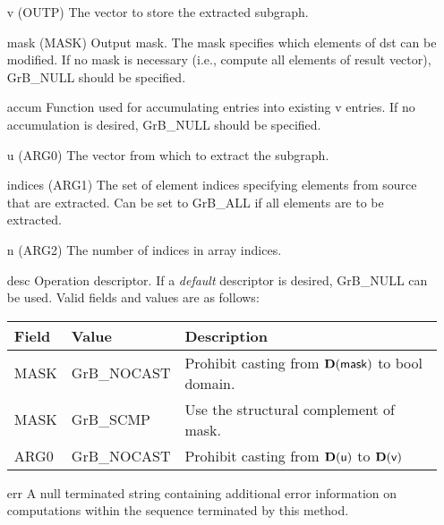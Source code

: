\begin{itemize}[leftmargin=1in]
    \item[{\sf v}]   ({\sf OUTP}) The vector to store the extracted subgraph.

    \item[{\sf mask}] ({\sf MASK}) Output mask. The mask
    specifies which elements of {\sf dst} can be modified.
    If no mask is necessary (i.e., compute all elements of result
    vector), {\sf GrB\_NULL} should be specified.

    \item[{\sf accum}]  Function used for accumulating entries into existing {\sf v} entries. 
			If no accumulation is desired, {\sf GrB\_NULL} should be specified.

    \item[{\sf u}]   ({\sf ARG0}) The vector from which to extract the subgraph.
    \item[{\sf indices}]     ({\sf ARG1}) The set of element indices specifying elements from source that
                              are extracted. Can
                              be set to {\sf GrB\_ALL} if all elements are
                              to be extracted.
    \item[{\sf n}]     ({\sf ARG2}) The number of indices in array {\sf indices}.

    \item[{\sf desc}]   Operation descriptor. If a
    \emph{default} descriptor is desired, {\sf GrB\_NULL} can be
    used.  Valid fields and values are as follows: \\
    \begin{tabular}{lll}
    Field  & Value & Description \\
    \hline
    {\sf MASK} & {\sf GrB\_NOCAST} & Prohibit casting from $\bold{D}({\sf mask})$ to {\sf bool} domain. \\
    {\sf MASK} & {\sf GrB\_SCMP}   & Use the structural complement of {\sf mask}. \\
    {\sf ARG0} & {\sf GrB\_NOCAST} & Prohibit casting from $\bold{D}({\sf u})$ to $\bold{D}({\sf v})$ \\
    \end{tabular}
    \item[{\sf err}]     A null terminated string containing additional error
                         information on computations within the sequence 
                         terminated by this method. 
\end{itemize}


